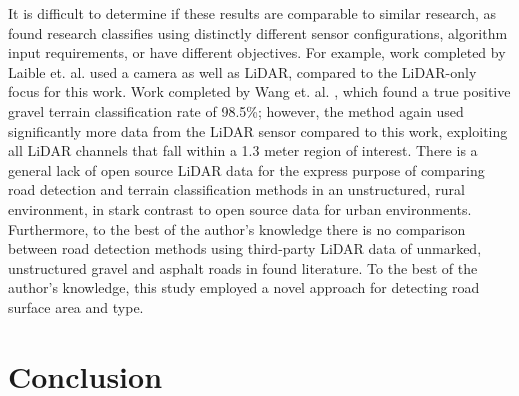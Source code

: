 \documentclass[journal,onecolumn]{IEEEtran}
\begin{document}
		{It is difficult to determine if these results are comparable to similar research, as found research classifies using distinctly different sensor configurations,  algorithm input requirements, or have different objectives. For example, work completed by Laible et. al. \cite{levi_3d_2012_light} used a camera as well as LiDAR, compared to the LiDAR-only focus for this work. Work completed by Wang et. al. \cite{wang_road_nodate}, which found a true positive gravel terrain classification rate of 98.5\%; however, the method again used significantly more data from the LiDAR sensor compared to this work, exploiting all LiDAR channels that fall within a 1.3 meter region of interest. There is a general lack of open source LiDAR data for the express purpose of comparing road detection and terrain classification methods in an unstructured, rural environment, in stark contrast to open source data for urban environments. Furthermore, to the best of the author's knowledge there is no comparison between road detection methods using third-party LiDAR data of unmarked, unstructured gravel and asphalt roads in found literature. To the best of the author's knowledge, this study employed a novel approach for detecting road surface area and type.}



	

	\section{Conclusion}
\end{document}
